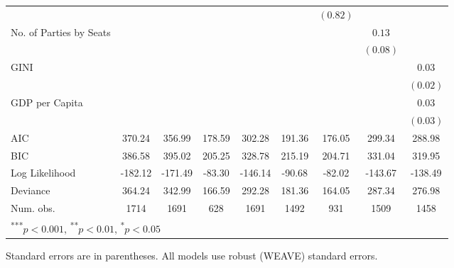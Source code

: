 \documentclass[a4paper]{article}\usepackage[]{graphicx}\usepackage[]{color}
\begin{document}
\begin{table}
\begin{center}
{\begin{tabular}{l c c c c c c c c }
                        &               &               &              &             &             & $(0.82)$     &              &              \\
No. of Parties by Seats &               &               &              &             &             &              & $0.13$       &              \\
                        &               &               &              &             &             &              & $(0.08)$     &              \\
GINI                    &               &               &              &             &             &              &              & $0.03$       \\
                        &               &               &              &             &             &              &              & $(0.02)$     \\
GDP per Capita          &               &               &              &             &             &              &              & $0.03$       \\
                        &               &               &              &             &             &              &              & $(0.03)$     \\
\hline
AIC                     & 370.24        & 356.99        & 178.59       & 302.28      & 191.36      & 176.05       & 299.34       & 288.98       \\
BIC                     & 386.58        & 395.02        & 205.25       & 328.78      & 215.19      & 204.71       & 331.04       & 319.95       \\
Log Likelihood          & -182.12       & -171.49       & -83.30       & -146.14     & -90.68      & -82.02       & -143.67      & -138.49      \\
Deviance                & 364.24        & 342.99        & 166.59       & 292.28      & 181.36      & 164.05       & 287.34       & 276.98       \\
Num. obs.               & 1714          & 1691          & 628          & 1691        & 1492        & 931          & 1509         & 1458         \\
\hline
\multicolumn{9}{l}{\scriptsize{\textsuperscript{***}$p<0.001$, 
  \textsuperscript{**}$p<0.01$, 
  \textsuperscript{*}$p<0.05$}}
\end{tabular}


}
\end{center}
{\scriptsize{
    Standard errors are in parentheses. All models use robust (WEAVE) standard errors. \\
}}
\end{table}
\end{document}
